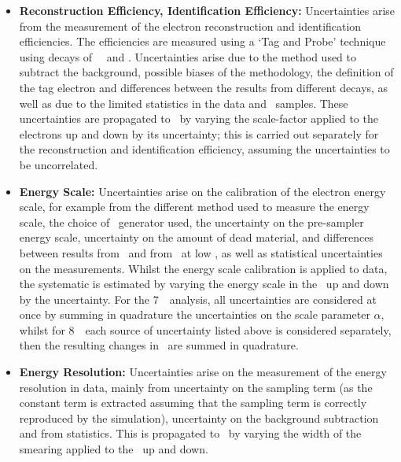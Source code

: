 \begin{itemize}
     \item {\bf Reconstruction Efficiency, Identification Efficiency:}
     Uncertainties arise from the measurement of the electron reconstruction and
     identification efficiencies. The efficiencies are measured using a `Tag and
     Probe' technique using decays of \W\, \Z\ and \JPsi. Uncertainties arise
     due to the method used to subtract the background, possible biases of the
     methodology, the definition of the
     tag electron and differences between the results from different decays, as
     well as due to the limited statistics in the data and \mc\ samples. These
     uncertainties are propagated to \CZZ\ by varying the scale-factor applied
     to the electrons up and down by its uncertainty; this is carried out
     separately for the reconstruction and identification efficiency, assuming
     the uncertainties to be uncorrelated.

    \item {\bf Energy Scale:}
    Uncertainties arise on the calibration of the electron energy scale, for
    example from the different method used to measure the energy scale, the
    choice of \mc\ generator used, the uncertainty on the pre-sampler energy 
    scale, uncertainty on the amount of dead material, and differences between
    results from \Zee\ and from \JPsiee\ at low \et, as well as statistical
    uncertainties on the measurements. Whilst the energy scale calibration is
    applied to data, the systematic is estimated by varying the energy scale in
    the \mc\ up and down by the uncertainty. For the 7~\tev\ analysis, all
    uncertainties are considered at once by summing in quadrature the
    uncertainties on the scale parameter $\alpha$, whilst for 8~\tev\ each source of
    uncertainty listed above is considered separately, then the resulting
    changes in \CZZ\ are summed in quadrature.

    \item {\bf Energy Resolution:} Uncertainties arise on the measurement of the
    energy resolution in data, mainly from uncertainty on the sampling term (as the
    constant term is extracted assuming that the sampling term is correctly
    reproduced by the simulation), uncertainty on the background subtraction and
    from statistics. This is propagated to \CZZ\ by varying the width of the 
    smearing applied to the \mc\ up and down.


\end{itemize}
